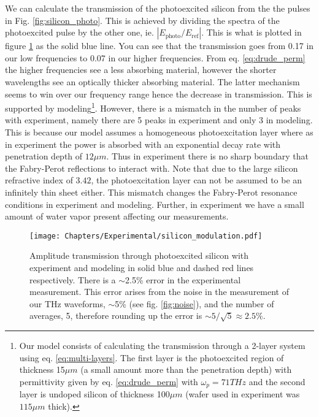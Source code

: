 We can calculate the transmission of the photoexcited silicon from the the pulses in Fig. \ref{fig:silicon_photo}. This is achieved by dividing the spectra of the photoexcited pulse by the other one, ie. $|E_{\text{photo}} / E_{\text{ref}}|$.  This is what is plotted in figure \ref{fig:silicon_modulation} as the solid blue line. You can see that the transmission goes from 0.17 in our low frequencies to 0.07 in our higher frequencies.  From eq. \eqref{eq:drude_perm} the higher frequencies see a less absorbing material, however the shorter wavelengths see an optically thicker absorbing material. The latter mechanism seems to win over our frequency range hence the decrease in transmission. This is supported by modeling\footnote{Our model consists of calculating the transmission through a 2-layer system using eq. \eqref{eq:multi-layers}. The first layer is the photoexcited region of thickness 15$\mu m$ (a small amount more than the penetration depth) with permittivity given by eq. \eqref{eq:drude_perm} with $\omega_p=71THz$ and the second layer is undoped silicon of thickness 100$\mu m$ (wafer used in experiment was $115 \mu m$ thick).}. However, there is a mismatch in the number of peaks with experiment, namely there are 5 peaks in experiment and only 3 in modeling. This is because our model assumes a homogeneous photoexcitation layer where as in experiment the power is absorbed with an exponential decay rate with penetration depth of $12\mu m$. Thus in experiment there is no sharp boundary that the Fabry-Perot reflections to interact with. Note that due to the large silicon refractive index of $3.42$, the photoexcitation layer can not be assumed to be an infinitely thin sheet either. This mismatch changes the Fabry-Perot resonance conditions in experiment and modeling. Further, in experiment we have a small amount of water vapor present affecting our measurements.
\begin{figure}[h!]\centering
\texttt{[image: Chapters/Experimental/silicon\_modulation.pdf]}
\caption{Amplitude transmission through photoexcited silicon with experiment and modeling in solid blue and dashed red lines respectively. There is a $\sim$2.5\% error in the experimental measurement. This error arises from the noise in the measurement of our THz waveforms, $\sim$5\% (see fig. \ref{fig:noise}), and the number of averages, 5, therefore rounding up the error is $\sim 5/\sqrt{5} \approx 2.5\%$.}
\label{fig:silicon_modulation}
\end{figure}


